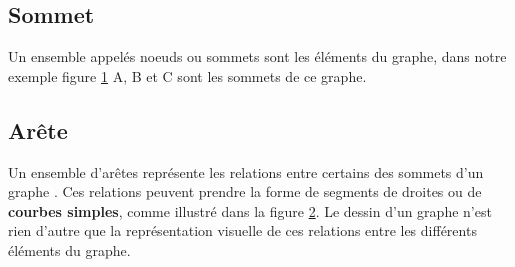 \documentclass[hidelinks,letterpaper,12pt]{article}
\begin{document}
\subsection{Sommet}
\label{Sommets}		
Un ensemble appelés noeuds ou sommets sont les éléments du graphe, dans notre exemple figure \ref{Graphe sans arêtes, nommé stable} A, B et C sont les sommets de ce graphe.
\\
\begin{figure}[H]
\centering
{}
\label{Graphe sans arêtes, nommé stable}	
\end{figure}

\subsection{Arête}
\label{Arêtes}
Un ensemble d'arêtes représente les relations entre certains des sommets d'un graphe \citep{ChristianLaforest}. Ces relations peuvent prendre la forme de segments de droites ou de \textbf{courbes simples}, comme illustré dans la figure \ref{Graphe avec une courbe simple}. Le dessin d'un graphe n'est rien d'autre que la représentation visuelle de ces relations entre les différents éléments du graphe.

\begin{figure}[H]
\centering
{} 
\label{Graphe avec une courbe simple}	
\end{figure}
\end{document}
